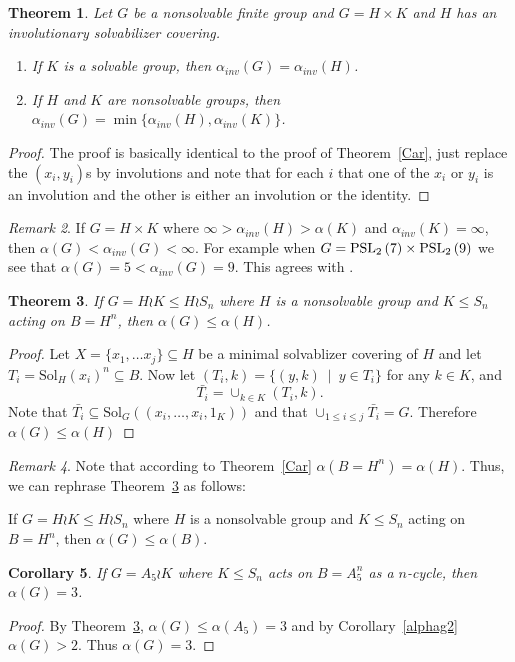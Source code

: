 \documentclass{amsart}
\newcommand{\Solv}{\text{Sol}}
\newtheorem{theorem}{Theorem}[section]
\newtheorem{corollary}[theorem]{Corollary}
\theoremstyle{definition}
\theoremstyle{remark}
\newtheorem{remark}[theorem]{Remark}
\begin{document}
\begin{theorem}\label{Inv}
    Let $G$ be a nonsolvable finite group and $G=H\times K$ and $H$ has an involutionary solvabilizer covering.
    \begin{enumerate}
        \item If $K$ is a solvable group, then $\alpha_{inv}(G)=\alpha_{inv}(H)$.
         \item If $H$ and $K$ are nonsolvable groups, then $\alpha_{inv}(G)=\min\{\alpha_{inv}(H),\alpha_{inv}(K)\}$.
         
    \end{enumerate}
    
\end{theorem}
\begin{proof}
The proof is basically identical to the proof of Theorem~\ref{Car}, just replace the $(x_i, y_i)$s  by involutions and note that for each $i$ that  one of the $x_i$ or $y_i$ is an involution and the other is either an involution or the identity.
\end{proof}

\begin{remark} If $G=H\times K$ where $\infty>\alpha_{inv}(H)>\alpha(K)$ and $\alpha_{inv}(K)=\infty$, then $\alpha(G)<\alpha_{inv}(G)<\infty$. For example when $G=\operatorname{PSL}_{2}\left(7\right)\times \operatorname{PSL}_{2}\left(9\right)$ we see that $\alpha(G)=5<\alpha_{inv}(G)=9$. This agrees with \cite{GAP4}.
\end{remark}

\begin{theorem}\label{TW}
    If $G=H\wr K\le H\wr S_n$ where $H$ is a nonsolvable group and $K\le S_n$ acting on $B=H^n$, then $\alpha(G)\le\alpha(H)$.\end{theorem}
    \begin{proof}
        Let $X=\{x_1,\dots x_j\}\subseteq H$ be a minimal solvablizer covering of $H$ and let $T_i=\Solv_H(x_i)^n\subseteq B$. Now let
        $(T_i,k)=\{(y,k)\ \mid\ y\in T_i\}$ for any $k\in K$, and $$\bar{T_i}=\cup_{k\in K} (T_i,k).$$
        Note that $\bar{T_i}\subseteq\Solv_G((x_i,\dots, x_i,1_K))$ and that $\cup_{1\le i\le j}\bar{T_i}=G$. Therefore $\alpha(G)\le \alpha(H)$
    \end{proof}
\begin{remark}
    Note that according to Theorem~\ref{Car} $\alpha(B=H^n)=\alpha(H)$.
    Thus, we can rephrase Theorem~\ref{TW} as follows:

    If $G=H\wr K\le H\wr S_n$ where $H$ is a nonsolvable group and $K\le S_n$ acting on $B=H^n$, then $\alpha(G)\le\alpha(B)$.
    \end{remark}
\begin{corollary}
    If $G=A_5\wr K$ where $K\le S_n$ acts on $B=A_5^n$ as a $n$-cycle, then $\alpha(G)=3$.
\end{corollary}   
\begin{proof}
    By Theorem~\ref{TW}, $\alpha(G)\le\alpha(A_5)=3$ and by Corollary~\ref{alphag2} $\alpha(G)>2$. Thus  $\alpha(G)=3$.
\end{proof}
\end{document}
